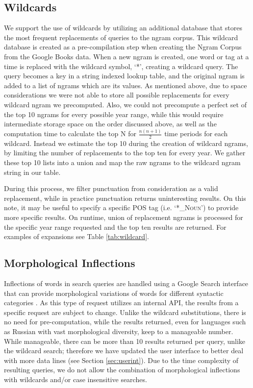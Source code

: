 \documentclass[11pt]{article}
\begin{document}
\subsection{Wildcards}
\label{sec:wildcards}
	We support the use of wildcards by utilizing an additional database that stores the most frequent replacements of queries to the ngram corpus. This wildcard database is created as a pre-compilation step when creating the Ngram Corpus from the Google Books data. When a new ngram is created, one word or tag at a time is replaced with the wildcard symbol, `*', creating a wildcard query. The query becomes a key in a string indexed lookup table, and the original ngram is added to a list of ngrams which are its values. As mentioned above, due to space considerations we were not able to store all possible replacements for every wildcard ngram we precomputed. Also, we could not precompute a perfect set of the top 10 ngrams for every possible year range, while this would require intermediate storage space on the order discussed above, as well as the computation time to calculate the top N for $\frac{n(n+1)}{2}$ time periods for each wildcard. Instead we estimate the top 10 during the creation of wildcard ngrams, by limiting the number of replacements to the top ten for every year. We gather these top 10 lists into a union and map the raw ngrams to the wildcard ngram string in our table. 
	
	During this process, we filter punctuation from consideration as a valid replacement, while in practice punctuation returns uninteresting results. On this note, it may be useful to specify a specific \textsf{\textsc{POS}} tag (i.e. `*\textsf{\textsc{\_Noun}}') to provide more specific results. On runtime, union of replacement ngrams is processed for the specific year range requested and the top ten results are returned. For examples of expansions see Table \ref{tab:wildcard}. 


\subsection{Morphological Inflections}
Inflections of words in search queries are handled using a Google Search interface that can provide morphological variations of words for different syntactic categories \cite{durrett2013supervised}. As this type of request utilizes an internal API, the results from a specific request are subject to change. Unlike the wildcard substitutions, there is no need for pre-computation, while the results returned, even for languages such as Russian with vast morphological diversity, keep to a manageable number. While manageable, there can be more than 10 results returned per query, unlike the wildcard search; therefore we have updated the user interface to better deal with more data lines (see Section \ref{sec:userint}). Due to the time complexity of resulting queries, we do not allow the combination of morphological inflections with wildcards and/or case insensitive searches.
\end{document}
